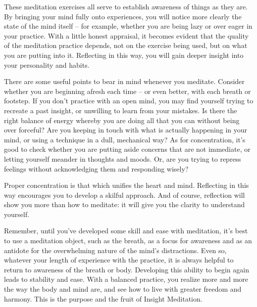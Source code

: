 
These meditation exercises all serve to establish awareness of things as
they are. By bringing your mind fully onto experiences, you will notice
more clearly the state of the mind itself -- for example, whether you are
being lazy or over eager in your practice. With a little honest
appraisal, it becomes evident that the quality of the meditation
practice depends, not on the exercise being used, but on what you are
putting into it. Reflecting in this way, you will gain deeper insight
into your personality and habits.

There are some useful points to bear in mind whenever you meditate.
Consider whether you are beginning afresh each time -- or even better,
with each breath or footstep. If you don't practice with an open mind,
you may find yourself trying to recreate a past insight, or unwilling to
learn from your mistakes. Is there the right balance of energy whereby
you are doing all that you can without being over forceful? Are you
keeping in touch with what is actually happening in your mind, or using
a technique in a dull, mechanical way? As for concentration, it's good
to check whether you are putting aside concerns that are not immediate,
or letting yourself meander in thoughts and moods. Or, are you trying to
repress feelings without acknowledging them and responding wisely?

Proper concentration is that which unifies the heart and mind.
Reflecting in this way encourages you to develop a skilful approach. And
of course, reflection will show you more than how to meditate: it will
give you the clarity to understand yourself.

Remember, until you've developed some skill and ease with meditation,
it's best to use a meditation object, such as the breath, as a focus for
awareness and as an antidote for the overwhelming nature of the mind's
distractions. Even so, whatever your length of experience with the
practice, it is always helpful to return to awareness of the breath or
body. Developing this ability to begin again leads to stability and
ease. With a balanced practice, you realize more and more the way the
body and mind are, and see how to live with greater freedom and harmony.
This is the purpose and the fruit of Insight Meditation.

